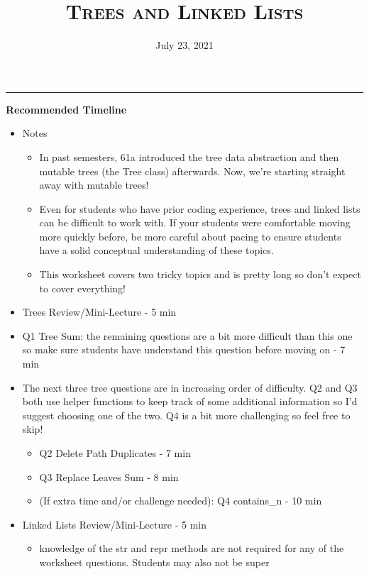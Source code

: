 \documentclass{exam}
\title{\textsc{Trees and Linked Lists}}
\date{July 23, 2021}
\begin{document}
\maketitle
\rule{\textwidth}{0.15em}
\fontsize{12}{15}\selectfont

\begin{guide}
\textbf{Recommended Timeline}
\begin{itemize}
    \item Notes
    \begin{itemize}
        \item In past semesters, 61a introduced the tree data abstraction and then mutable trees 
        (the Tree class) afterwards. Now, we're starting straight away with mutable trees!
        \item Even for students who have prior coding experience, trees and linked lists can be difficult to work with. 
        If your students were comfortable moving more quickly before, be more careful about pacing to ensure students have 
        a solid conceptual understanding of these topics.
        \item This worksheet covers two tricky topics and is pretty long so don't expect to cover everything!
    \end{itemize}
    \item Trees Review/Mini-Lecture - 5 min
    \item Q1 Tree Sum: the remaining questions are a bit more difficult than this one so make sure students have
    understand this question before moving on - 7 min
    \item The next three tree questions are in increasing order of difficulty.
    Q2 and Q3 both use helper functions to keep track of some additional information so I'd suggest choosing one of the two.
    Q4 is a bit more challenging so feel free to skip!
    \begin{itemize}
        \item Q2 Delete Path Duplicates - 7 min
        \item Q3 Replace Leaves Sum - 8 min
        \item (If extra time and/or challenge needed): Q4 contains\_n - 10 min
    \end{itemize}
    \item Linked Lists Review/Mini-Lecture - 5 min
    \begin{itemize}
        \item knowledge of the str and repr methods are not required for any of the worksheet questions. Students may also not be super 

\end{itemize}
\end{itemize}
\end{guide}
\end{document}
